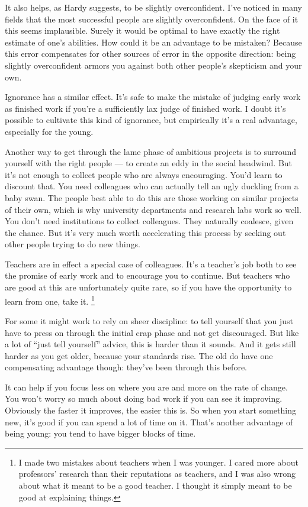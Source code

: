 \documentclass[12pt]{book}
\begin{document}
It also helps, as Hardy suggests, to be slightly overconfident. I've
noticed in many fields that the most successful people are slightly
overconfident. On the face of it this seems implausible. Surely it would
be optimal to have exactly the right estimate of one's abilities. How
could it be an advantage to be mistaken? Because this error compensates
for other sources of error in the opposite direction: being slightly
overconfident armors you against both other people's skepticism and your
own.

Ignorance has a similar effect. It's safe to make the mistake of judging
early work as finished work if you're a sufficiently lax judge of
finished work. I doubt it's possible to cultivate this kind of
ignorance, but empirically it's a real advantage, especially for the
young.

Another way to get through the lame phase of ambitious projects is to
surround yourself with the right people --- to create an eddy in the
social headwind. But it's not enough to collect people who are always
encouraging. You'd learn to discount that. You need colleagues who can
actually tell an ugly duckling from a baby swan. The people best able to
do this are those working on similar projects of their own, which is why
university departments and research labs work so well. You don't need
institutions to collect colleagues. They naturally coalesce, given the
chance. But it's very much worth accelerating this process by seeking
out other people trying to do new things.

Teachers are in effect a special case of colleagues. It's a teacher's
job both to see the promise of early work and to encourage you to
continue. But teachers who are good at this are unfortunately quite
rare, so if you have the opportunity to learn from one, take it.
\footnote{I made two mistakes about teachers when I was younger. I cared
more about professors' research than their reputations as teachers, and
I was also wrong about what it meant to be a good teacher. I thought it
simply meant to be good at explaining things.}

For some it might work to rely on sheer discipline: to tell yourself
that you just have to press on through the initial crap phase and not
get discouraged. But like a lot of ``just tell yourself'' advice, this
is harder than it sounds. And it gets still harder as you get older,
because your standards rise. The old do have one compensating advantage
though: they've been through this before.

It can help if you focus less on where you are and more on the rate of
change. You won't worry so much about doing bad work if you can see it
improving. Obviously the faster it improves, the easier this is. So when
you start something new, it's good if you can spend a lot of time on it.
That's another advantage of being young: you tend to have bigger blocks
of time.
\end{document}
